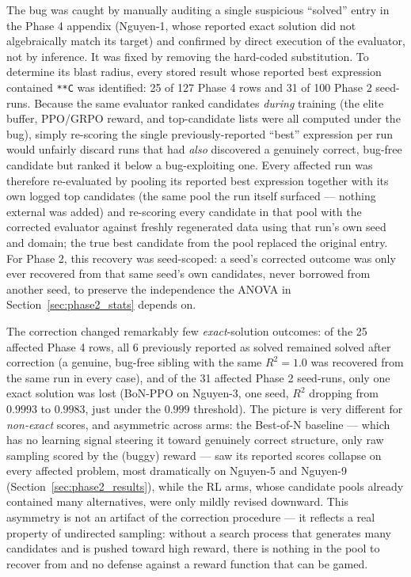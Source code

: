 The bug was caught by manually auditing a single suspicious ``solved'' entry in the Phase 4 appendix (Nguyen-1, whose reported exact solution did not algebraically match its target) and confirmed by direct execution of the evaluator, not by inference. It was fixed by removing the hard-coded substitution. To determine its blast radius, every stored result whose reported best expression contained \texttt{**C} was identified: 25 of 127 Phase 4 rows and 31 of 100 Phase 2 seed-runs. Because the same evaluator ranked candidates \emph{during} training (the elite buffer, PPO/GRPO reward, and top-candidate lists were all computed under the bug), simply re-scoring the single previously-reported ``best'' expression per run would unfairly discard runs that had \emph{also} discovered a genuinely correct, bug-free candidate but ranked it below a bug-exploiting one. Every affected run was therefore re-evaluated by pooling its reported best expression together with its own logged top candidates (the same pool the run itself surfaced --- nothing external was added) and re-scoring every candidate in that pool with the corrected evaluator against freshly regenerated data using that run's own seed and domain; the true best candidate from the pool replaced the original entry. For Phase 2, this recovery was seed-scoped: a seed's corrected outcome was only ever recovered from that same seed's own candidates, never borrowed from another seed, to preserve the independence the ANOVA in Section~\ref{sec:phase2_stats} depends on.

The correction changed remarkably few \emph{exact}-solution outcomes: of the 25 affected Phase 4 rows, all 6 previously reported as solved remained solved after correction (a genuine, bug-free sibling with the same $R^2=1.0$ was recovered from the same run in every case), and of the 31 affected Phase 2 seed-runs, only one exact solution was lost (BoN-PPO on Nguyen-3, one seed, $R^2$ dropping from $0.9993$ to $0.9983$, just under the $0.999$ threshold). The picture is very different for \emph{non-exact} scores, and asymmetric across arms: the Best-of-N baseline --- which has no learning signal steering it toward genuinely correct structure, only raw sampling scored by the (buggy) reward --- saw its reported scores collapse on every affected problem, most dramatically on Nguyen-5 and Nguyen-9 (Section~\ref{sec:phase2_results}), while the RL arms, whose candidate pools already contained many alternatives, were only mildly revised downward. This asymmetry is not an artifact of the correction procedure --- it reflects a real property of undirected sampling: without a search process that generates many candidates and is pushed toward high reward, there is nothing in the pool to recover from and no defense against a reward function that can be gamed.

